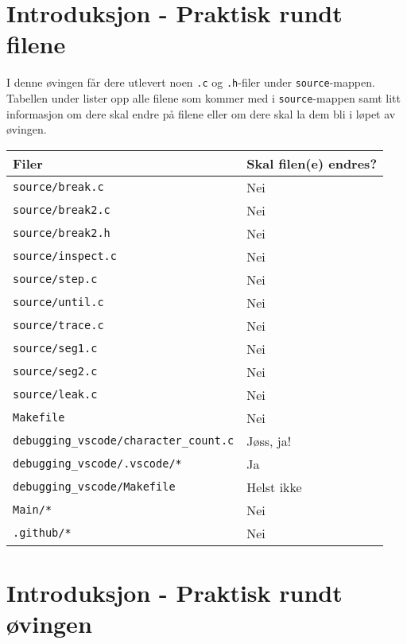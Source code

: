 

\begin{alphasection}

\section{Introduksjon - Praktisk rundt filene}

I denne øvingen får dere utlevert noen \verb|.c| og \verb|.h|-filer under \verb|source|-mappen. Tabellen under lister opp alle filene som kommer med i \verb|source|-mappen samt litt informasjon om dere skal endre på filene eller om dere skal la dem bli i løpet av øvingen.

\begin{center}
 \begin{tabular}{|p{8.5cm} p{5.5cm}|} 
 \hline
 \textbf{Filer} & \textbf{Skal filen(e) endres?}  \\ [0.5ex] 
 \hline\hline
  \verb|source/break.c| & Nei  \\ 
 \hline
 \verb|source/break2.c| & Nei  \\ 
 \hline
 \verb|source/break2.h| & Nei  \\ 
 \hline
 \verb|source/inspect.c| & Nei  \\ 
 \hline
 \verb|source/step.c| & Nei  \\ 
 \hline
  \verb|source/until.c| & Nei  \\ 
 \hline
  \verb|source/trace.c| & Nei  \\ 
 \hline
  \verb|source/seg1.c| & Nei  \\ 
 \hline
  \verb|source/seg2.c| & Nei  \\ 
 \hline
  \verb|source/leak.c| & Nei  \\
 \hline
  \verb|Makefile| & Nei \\
 \hline
  \verb|debugging_vscode/character_count.c| & Jøss, ja! \\
 \hline
  \verb|debugging_vscode/.vscode/*| & Ja \\
 \hline
  \verb|debugging_vscode/Makefile| & Helst ikke \\
   \hline
  \verb|Main/*| & Nei  \\ 
 \hline
  \verb|.github/*| & Nei \\
 \hline 
\end{tabular}
\end{center}

\section{Introduksjon - Praktisk rundt øvingen}\label{sec:2-innføring}


\end{alphasection}
